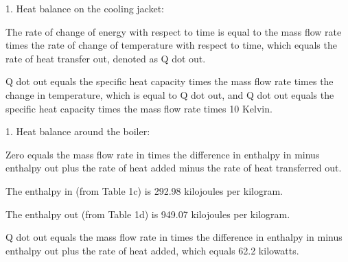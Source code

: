 1. Heat balance on the cooling jacket:

The rate of change of energy with respect to time is equal to the mass flow rate times the rate of change of temperature with respect to time, which equals the rate of heat transfer out, denoted as Q dot out.

Q dot out equals the specific heat capacity times the mass flow rate times the change in temperature, which is equal to Q dot out, and Q dot out equals the specific heat capacity times the mass flow rate times 10 Kelvin.

1. Heat balance around the boiler:

Zero equals the mass flow rate in times the difference in enthalpy in minus enthalpy out plus the rate of heat added minus the rate of heat transferred out.

The enthalpy in (from Table 1c) is 292.98 kilojoules per kilogram.

The enthalpy out (from Table 1d) is 949.07 kilojoules per kilogram.

Q dot out equals the mass flow rate in times the difference in enthalpy in minus enthalpy out plus the rate of heat added, which equals 62.2 kilowatts.